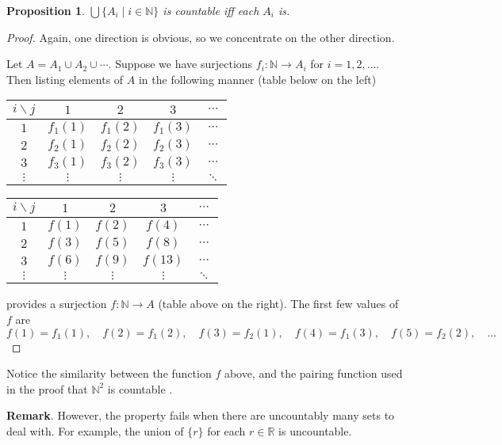\documentclass[12pt]{article}
\newtheorem{prop}{Proposition}
\begin{document}
\begin{prop} $\bigcup \lbrace A_i \mid i \in \mathbb{N} \rbrace$ is countable iff each $A_i$ is. \end{prop}
\begin{proof}  Again, one direction is obvious, so we concentrate on the other direction.

Let $A=A_1\cup A_2\cup \cdots$.  Suppose we have surjections $f_i:\mathbb{N} \to A_i$ for $i=1,2,\ldots$.  Then listing elements of $A$ in the following manner (table below on the left)
\begin{center}
\begin{tabular}{ c|c c c c }
$i \backslash j$ & $1$ & $2$ & $3$ & $\cdots$ \\
\hline
$1$ &	$f_1(1)$ & $f_1(2)$ & $f_1(3)$ & $\cdots$ \\
$2$ &	$f_2(1)$ & $f_2(2)$ & $f_2(3)$ & $\cdots$ \\
$3$ &	$f_3(1)$ & $f_3(2)$ & $f_3(3)$ & $\cdots$ \\
$\vdots$ &	$\vdots$ & $\vdots$ & $\vdots$ & $\ddots$ 
\end{tabular}
\hspace{1.25cm}
\begin{tabular}{ c|c c c c }
$i \backslash j$ & $1$ & $2$ & $3$ & $\cdots$ \\
\hline
$1$ & $f(1)$ & $f(2)$ & $f(4)$ & $\cdots$ \\
$2$ & $f(3)$ & $f(5)$ & $f(8)$ & $\cdots$ \\
$3$ & $f(6)$ & $f(9)$ & $f(13)$ & $\cdots$ \\
$\vdots$ & $\vdots$ & $\vdots$ & $\vdots$ & $\ddots$ 
\end{tabular}
\end{center}
provides a surjection $f:\mathbb{N}\to A$ (table above on the right).  The first few values of $f$ are 
$$f(1)=f_1(1),\quad f(2)=f_1(2), \quad f(3)=f_2(1),\quad f(4)=f_1(3), \quad f(5)= f_2(2), \quad \ldots$$
\end{proof}
Notice the similarity between the function $f$ above, and the pairing function used in the proof that $\mathbb{N}^2$ is countable .

\textbf{Remark}. However, the property fails when there are uncountably many sets to deal with.  For example, the union of $\lbrace r\rbrace$ for each $r\in \mathbb{R}$ is uncountable.
\end{document}
